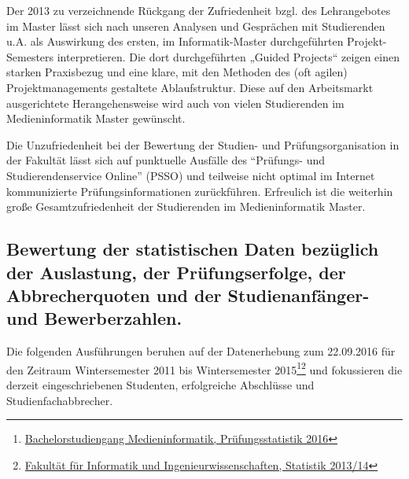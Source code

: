 Der 2013 zu verzeichnende Rückgang der Zufriedenheit bzgl. des
Lehrangebotes im Master lässt sich nach unseren Analysen und Gesprächen
mit Studierenden u.A. als Auswirkung des ersten, im Informatik-Master
durchgeführten Projekt-Semesters interpretieren. Die dort durchgeführten
„Guided Projects`` zeigen einen starken Praxisbezug und eine klare, mit
den Methoden des (oft agilen) Projektmanagements gestaltete
Ablaufstruktur. Diese auf den Arbeitsmarkt ausgerichtete
Herangehensweise wird auch von vielen Studierenden im Medieninformatik
Master gewünscht.

Die Unzufriedenheit bei der Bewertung der Studien- und
Prüfungsorganisation in der Fakultät lässt sich auf punktuelle Ausfälle
des ``Prüfungs- und Studierendenservice Online'' (PSSO) und teilweise
nicht optimal im Internet kommunizierte Prüfungsinformationen
zurückführen. Erfreulich ist die weiterhin große Gesamtzufriedenheit der
Studierenden im Medieninformatik Master.

\subsection{Bewertung der statistischen Daten bezüglich der
Auslastung, der Prüfungserfolge, der Abbrecherquoten und der
Studienanfänger- und
Bewerberzahlen.}\label{bewertung-der-statistischen-daten-bezuxfcglich-der-auslastung-der-pruxfcfungserfolge-der-abbrecherquoten-und-der-studienanfuxe4nger--und-bewerberzahlen.}

Die folgenden Ausführungen beruhen auf der Datenerhebung zum 22.09.2016
für den Zeitraum Wintersemester 2011 bis Wintersemester 2015\footnote{\href{../anhaenge/pruefungsstatistiken.pdf}{Bachelorstudiengang
  Medieninformatik, Prüfungsstatistik 2016}}\footnote{\href{../anhaenge/Fakultaetsstruktur-Studienangebot-Personal-Haushaltsmittel-Kennzahlen-2014.pdf}{Fakultät
  für Informatik und Ingenieurwissenschaften, Statistik 2013/14}} und
fokussieren die derzeit eingeschriebenen Studenten, erfolgreiche
Abschlüsse und Studienfachabbrecher.

